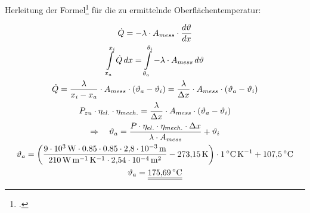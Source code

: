 \documentclass[12pt,a4paper,parskip]{scrartcl}
\begin{document}
Herleitung der Formel\footcite[Vgl.][18-19]{wae} für die zu ermittelnde Oberflächentemperatur:

\begin{gather}
\dot{Q} = - \lambda \cdot A_{mess} \cdot \frac{d\vartheta}{dx}\\
\int\limits_{x_a}^{x_i} \dot{Q}\,dx = \int\limits_{\theta_a}^{\theta_i} - \lambda \cdot A_{mess}\,d\vartheta\\
\dot{Q} = \frac{\lambda}{x_i - x_a} \cdot A_{mess} \cdot (\vartheta_a - \vartheta_i) = \frac{\lambda}{\Delta x} \cdot A_{mess} \cdot (\vartheta_a - \vartheta_i)\\
P_{zu} \cdot \eta_{el.} \cdot \eta_{mech.} = \frac{\lambda}{\Delta x} \cdot A_{mess} \cdot (\vartheta_a - \vartheta_i)\\
\Rightarrow \quad  \vartheta_a = \frac{P \cdot \eta_{el.} \cdot \eta_{mech.} \cdot \Delta x}{\lambda \cdot A_{mess}} + \vartheta_i \\
\vartheta_a = \left(\frac{\SI{9e3}{\watt} \cdot 0.85 \cdot 0.85 \cdot \SI{2.8e-3}{\meter}}{\SI{210}{\watt\per\meter\per\kelvin} \cdot \SI{2.54e-4}{\meter\squared}}- \SI{273.15}{\kelvin}\right) \cdot \SI{1}{\degreeCelsius\per\kelvin} + \SI{107.5}{\degreeCelsius} \notag\\
\vartheta_a = \underline{\underline{\SI{175.69}{\degreeCelsius}}} \notag
\end{gather}

  







 
 





\printbibliography
\end{document}
